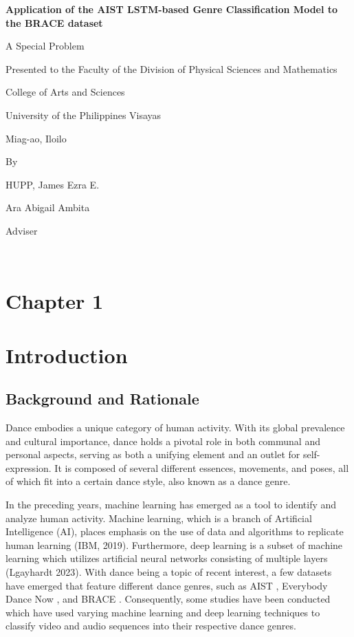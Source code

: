 \documentclass[12pt]{article}
\begin{document}
\linespread{1.5}
\begin{center}
    \thispagestyle{empty}
    \textbf{Application of the AIST LSTM-based Genre Classification Model to the BRACE dataset}

    \vspace{20mm}
    A Special Problem 
    \par Presented to the Faculty of the Division of Physical Sciences and Mathematics 
    \par College of Arts and Sciences 
    \par University of the Philippines Visayas 
    \par
    Miag-ao, Iloilo

    \vspace{20mm}
    By
    \par
    HUPP, James Ezra E.

    \vspace{20mm}
    Ara Abigail Ambita
    \par
    Adviser

\end{center}
\newpage
\tableofcontents
\newpage
\
\section*{Chapter 1}

\section{Introduction}

\subsection{Background and Rationale}
\noindent 
\par Dance embodies a unique category of human activity. With its global prevalence and cultural importance, dance holds a pivotal role in both communal and personal aspects, serving as both a unifying element and an outlet for self-expression. It is composed of several different essences, movements, and poses, all of which fit into a certain dance style, also known as a dance genre. 
\vspace{5mm}

\par In the preceding years, machine learning has emerged as a tool to identify and analyze human activity. Machine learning, which is a branch of Artificial Intelligence (AI), places emphasis on the use of data and algorithms to replicate human learning (IBM, 2019). Furthermore, deep learning is a subset of machine learning which utilizes artificial neural networks consisting of multiple layers (Lgayhardt 2023). With dance being a topic of recent interest, a few datasets have emerged that feature different dance genres, such as AIST \parencite{aist}, Everybody Dance Now \parencite{chan2019everybody}, and BRACE \parencite{brace}. Consequently, some studies have been conducted which have used varying machine learning and deep learning techniques to classify video and audio sequences into their respective dance genres. 
\vspace{5mm}
\end{document}
